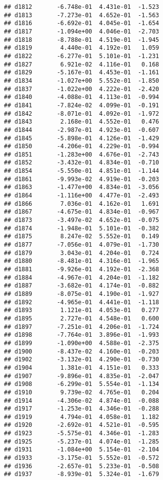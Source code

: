 \documentclass[
]{article}
\begin{document}
\begin{verbatim}
## d1812       -6.748e-01  4.431e-01  -1.523
## d1813       -7.273e-01  4.652e-01  -1.563
## d1816       -6.692e-01  4.045e-01  -1.654
## d1817       -1.094e+00  4.046e-01  -2.703
## d1818       -8.788e-01  4.519e-01  -1.945
## d1819        4.440e-01  4.192e-01   1.059
## d1822       -6.277e-01  5.101e-01  -1.231
## d1827        6.921e-02  4.116e-01   0.168
## d1829       -5.167e-01  4.453e-01  -1.161
## d1834       -1.027e+00  5.552e-01  -1.850
## d1837       -1.022e+00  4.222e-01  -2.420
## d1840       -4.088e-01  4.113e-01  -0.994
## d1841       -7.824e-02  4.099e-01  -0.191
## d1842       -8.071e-01  4.092e-01  -1.972
## d1843        2.168e-01  4.552e-01   0.476
## d1844       -2.987e-01  4.923e-01  -0.607
## d1845       -5.898e-01  4.126e-01  -1.429
## d1850       -4.206e-01  4.229e-01  -0.994
## d1851       -1.283e+00  4.676e-01  -2.743
## d1852       -3.432e-01  4.834e-01  -0.710
## d1854       -5.550e-01  4.851e-01  -1.144
## d1861       -9.993e-02  4.919e-01  -0.203
## d1863       -1.477e+00  4.834e-01  -3.056
## d1864       -1.116e+00  4.477e-01  -2.493
## d1866        7.036e-01  4.162e-01   1.691
## d1867       -4.675e-01  4.834e-01  -0.967
## d1873       -3.497e-02  4.652e-01  -0.075
## d1874       -1.948e-01  5.101e-01  -0.382
## d1875        8.247e-02  5.552e-01   0.149
## d1877       -7.056e-01  4.079e-01  -1.730
## d1879        3.043e-01  4.204e-01   0.724
## d1880       -8.481e-01  4.316e-01  -1.965
## d1881       -9.926e-01  4.192e-01  -2.368
## d1884       -4.967e-01  4.204e-01  -1.182
## d1887       -3.682e-01  4.174e-01  -0.882
## d1889       -8.075e-01  4.190e-01  -1.927
## d1892       -4.965e-01  4.441e-01  -1.118
## d1893        1.121e-01  4.053e-01   0.277
## d1895        2.727e-01  4.548e-01   0.600
## d1897       -7.251e-01  4.206e-01  -1.724
## d1898       -7.764e-01  3.896e-01  -1.993
## d1899       -1.090e+00  4.588e-01  -2.375
## d1900       -8.437e-02  4.160e-01  -0.203
## d1902       -3.132e-01  4.290e-01  -0.730
## d1904        1.381e-01  4.151e-01   0.333
## d1907       -9.896e-01  4.835e-01  -2.047
## d1908       -6.299e-01  5.554e-01  -1.134
## d1910        9.739e-02  4.765e-01   0.204
## d1914       -4.306e-02  4.874e-01  -0.088
## d1917       -1.253e-01  4.346e-01  -0.288
## d1919        4.794e-01  4.058e-01   1.182
## d1920       -2.692e-01  4.521e-01  -0.595
## d1923       -5.575e-01  4.346e-01  -1.283
## d1925       -5.237e-01  4.074e-01  -1.285
## d1931       -1.084e+00  5.154e-01  -2.104
## d1933       -3.175e-01  5.552e-01  -0.572
## d1936       -2.657e-01  5.233e-01  -0.508
## d1937       -8.939e-01  5.324e-01  -1.679

\end{verbatim}
\end{document}
